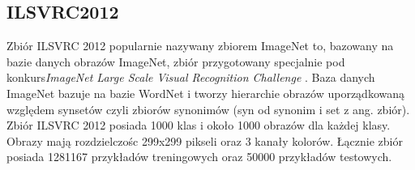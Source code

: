 \documentclass[
    left=2.5cm,         %
    right=2.5cm,        %
    top=2.5cm,          %
    bottom=3cm,         %
    bindingoffset=6mm,  %
    nohyphenation=false %
]{eiti/eiti-thesis}
\begin{document}
    \subsection{ILSVRC2012}\label{ILSVRC2012}
        Zbiór ILSVRC 2012 popularnie nazywany zbiorem ImageNet to, bazowany na bazie danych obrazów ImageNet, zbiór
        przygotowany specjalnie pod konkurs\textit{ImageNet Large Scale Visual Recognition Challenge} \cite{ILSVRC15}.
        Baza danych ImageNet bazuje na bazie WordNet i tworzy hierarchie obrazów uporządkowaną względem synsetów
        czyli zbiorów synonimów (syn od synonim i set z ang. zbiór). Zbiór ILSVRC 2012 posiada 1000 klas i około 1000
        obrazów dla każdej klasy. Obrazy mają rozdzielczośc 299x299 pikseli oraz 3 kanały kolorów. Łącznie zbiór posiada
        1281167 przykładów treningowych oraz 50000 przykładów testowych.
\end{document}
